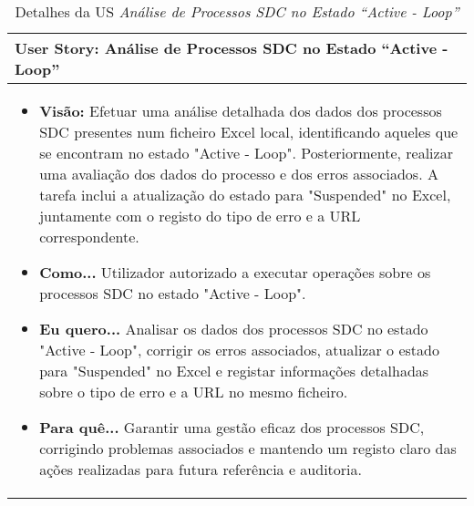                 \begin{table}[htbp] %
                    \centering
                    \begin{tabularx}{1\textwidth}{|>{\raggedright\arraybackslash}X|}
                        \hline
                        \rowcolor{lightgray}
                        \textbf{User Story:} Análise de Processos SDC no Estado ``Active - Loop'' \\
                        \hline
                        \rowcolor{lightgray!20}
                                        
                        \begin{itemize}
                            \item \textbf{Visão:} Efetuar uma análise detalhada dos dados dos processos SDC presentes num ficheiro Excel local, identificando aqueles que se encontram no estado "Active - Loop". Posteriormente, realizar uma avaliação dos dados do processo e dos erros associados. A tarefa inclui a atualização do estado para "Suspended" no Excel, juntamente com o registo do tipo de erro e a URL correspondente.

                            \item \textbf{Como...} Utilizador autorizado a executar operações sobre os processos SDC no estado "Active - Loop".

                            \item \textbf{Eu quero...} Analisar os dados dos processos SDC no estado "Active - Loop", corrigir os erros associados, atualizar o estado para "Suspended" no Excel e registar informações detalhadas sobre o tipo de erro e a URL no mesmo ficheiro.

                            \item \textbf{Para quê...} Garantir uma gestão eficaz dos processos SDC, corrigindo problemas associados e mantendo um registo claro das ações realizadas para futura referência e auditoria.
                        \end{itemize}
                        \\
                        \hline
                    \end{tabularx}
                    \caption{Detalhes da US \textit{Análise de Processos SDC no Estado ``Active - Loop''}}\label{table:python_us1}
                \end{table}

